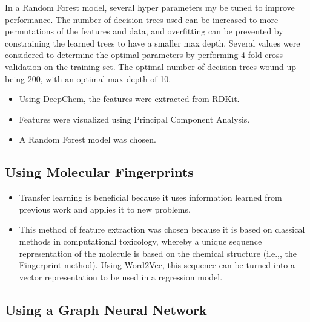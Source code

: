 \documentclass[12pt, oneside]{article}   	%
\begin{document}
In a Random Forest model, several hyper parameters my be tuned to improve performance. The number of decision trees used can be increased to more permutations of the features and data, and overfitting can be prevented by constraining the learned trees to have a smaller max depth. Several values were considered to determine the optimal parameters by performing 4-fold cross validation on the training set. The optimal number of decision trees wound up being 200, with an optimal max depth of 10.


\begin{itemize}
	\item Using DeepChem, the features were extracted from RDKit.
	\item Features were visualized using Principal Component Analysis.
	\item A Random Forest model was chosen.
\end{itemize}

\subsection{Using Molecular Fingerprints}
\begin{itemize}
	\item Transfer learning is beneficial because it uses information learned from previous work and applies it to new problems.
	\item This method of feature extraction was chosen because it is based on classical methods in computational toxicology, whereby a unique sequence representation of the molecule is based on the chemical structure (i.e.,, the Fingerprint method). Using Word2Vec, this sequence can be turned into a vector representation to be used in a regression model.
\end{itemize}

\subsection{Using a Graph Neural Network}
\end{document}
